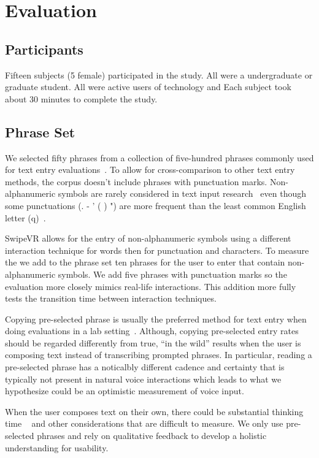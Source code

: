 \section{Evaluation}

\subsection{Participants}
Fifteen subjects (5 female) participated in the study.
All were a undergraduate or graduate student.
All were active users of technology and 
Each subject took about 30 minutes to complete the study.

\subsection{Phrase Set}
We selected fifty phrases from a collection of five-hundred phrases commonly used for text entry evaluations~\cite{mackenzie2003phrase}.
To allow for cross-comparison to other text entry methods, the corpus doesn't include phrases with punctuation marks.
Non-alphanumeric symbols are rarely considered in text input research~\cite{mackenzie2003phrase} even though some punctuations (. - ' ( ) ") are more frequent than the least common English letter (q)~\cite{malikpunctuation}.
 
SwipeVR allows for the entry of non-alphanumeric symbols using a different interaction technique for words then for punctuation and characters.
To measure the  we add to the phrase set ten phrases for the user to enter that contain non-alphanumeric symbols.
We add five phrases with punctuation marks so the evaluation more closely mimics real-life interactions.
This addition more fully tests the transition time between interaction techniques. 

Copying pre-selected phrase is usually the preferred method for text entry when doing evaluations in a lab setting~\cite{mackenzie2002character, mackenzie2003phrase}.
Although, copying pre-selected entry rates should be regarded differently from true, ``in the wild'' results when the user is composing text instead of transcribing prompted phrases.
In particular, reading a pre-selected phrase has a noticalbly different cadence and certainty that is typically not present in natural voice interactions which leads to what we hypothesize could be an optimistic measurement of voice input.

When the user composes text on their own, there could be substantial thinking time ~\cite{shneiderman2000limits} and other considerations that are difficult to measure.
We only use pre-selected phrases and rely on qualitative feedback to develop a holistic understanding for usability.



